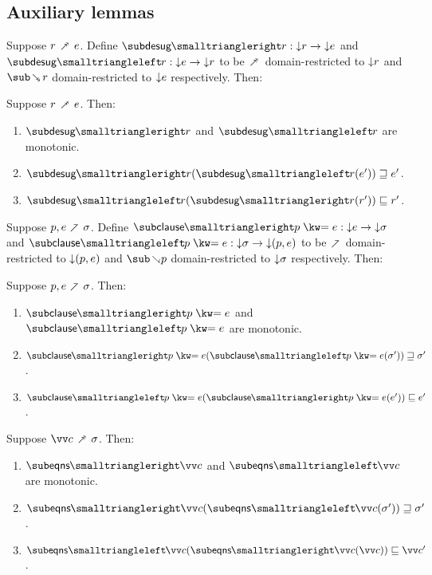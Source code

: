 \subsection{Auxiliary lemmas}

\begin{definition}
   Suppose $r \dfwdarrow e$. Define $\desugarListRestFwdF{r}: \Below{r} \to \Below{e}$ and $\desugarListRestBwdF{r}: \Below{e} \to \Below{r}$ to be $\desugarFwd$ domain-restricted to ${\downarrow}{r}$ and $\desugarBwd{r}$ domain-restricted to ${\downarrow}{e}$ respectively. Then:
\end{definition}

\begin{lemma}
  \label{lem:aux:desugarlistrest:gc}
  Suppose $r \dfwdarrow e$. Then:
  \begin{enumerate}
     \item $\desugarListRestFwdF{r}$ and $\desugarListRestBwdF{r}$ are monotonic.
     \item $\desugarListRestFwdF{r}(\desugarListRestBwdF{r}(e')) \geq e'$.
     \item $\desugarListRestBwdF{r}(\desugarListRestFwdF{r}(r')) \leq r'$.
  \end{enumerate}
\end{lemma}

\begin{definition}
   Suppose $p, e \clauseFwd \sigma$. Define $\clauseFwdF{\clause{p}{e}}: \Below{e} \to \Below{\sigma}$ and $\clauseBwdF{\clause{p}{e}}: \Below{\sigma} \to \Below{(p,e)}$ to be $\clauseFwd$ domain-restricted to ${\downarrow}{(p,e)}$ and $\clauseBwd{p}$ domain-restricted to ${\downarrow}{\sigma}$ respectively. Then:
\end{definition}

\begin{lemma}
  \label{lem:aux:clause:gc}
  Suppose $p, e \clauseFwd \sigma$. Then:
  \begin{enumerate}
     \item $\clauseFwdF{\clause{p}{e}}$ and $\clauseBwdF{\clause{p}{e}}$ are monotonic.
     \item $\clauseFwdF{\clause{p}{e}}(\clauseBwdF{\clause{p}{e}}(\sigma')) \geq \sigma'$.
     \item $\clauseBwdF{\clause{p}{e}}(\clauseFwdF{\clause{p}{e}}(e')) \leq e'$.
  \end{enumerate}
\end{lemma}

\begin{lemma}
  \label{lem:aux:clauses:gc}
  Suppose $\vec{c} \dfwdarrow \sigma$. Then:
  \begin{enumerate}
     \item $\desugarClausesFwdF{\vec{c}}$ and $\desugarClausesBwdF{\vec{c}}$ are monotonic.
     \item $\desugarClausesFwdF{\vec{c}}(\desugarClausesBwdF{\vec{c}}(\sigma')) \geq \sigma'$.
     \item $\desugarClausesBwdF{\vec{c}}(\desugarClausesFwdF{\vec{c}}(\vec{c})) \leq \vec{c}'$.
  \end{enumerate}
\end{lemma}


